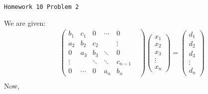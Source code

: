 \documentclass[12pt]{article}
\begin{document}
	\begin{center}
        \Large{\texttt{Homework 10 Problem 2}} \vspace*{0.8mm}  
	\end{center}
    We are given:
    \begin{align*}
      &\begin{pmatrix}
        b_1 & c_1 & 0 & \cdots & 0 \\
        a_2 & b_2 & c_2 &  & \vdots \\
        0 & a_3 & b_3 & \ddots & 0 & \\
        \vdots &  & \ddots & \ddots & c_{n-1} \\ 
        0 & \cdots & 0 & a_n & b_n
      \end{pmatrix}
      \begin{pmatrix}
        x_1 \\ x_2 \\ x_3 \\ \vdots \\ x_n 
      \end{pmatrix}
      = 
      \begin{pmatrix}
        d_1 \\ d_2 \\ d_3 \\ \vdots \\ d_n 
      \end{pmatrix} \\
    \end{align*}
    Now,
\end{document}
